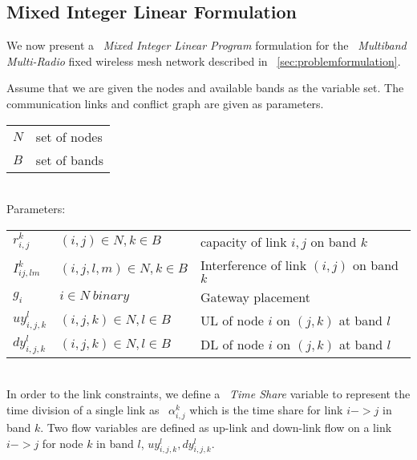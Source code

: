 \subsection{Mixed Integer Linear Formulation}
\label{subsec:linearopt}

We now present a ~\emph{Mixed Integer Linear Program} formulation for the ~\emph{Multiband Multi-Radio} fixed wireless mesh network described in ~\ref{sec:problemformulation}.



Assume that we are given the nodes and available bands as the variable set. The communication links and conflict graph are given as parameters.
\\
\begin{tabular}{ll}
$N$ & set of nodes  \\
$B$ & set of bands  \\
\end{tabular}\\
\vspace{2pt}
Parameters:
\vspace{1pt}

\begin{tabular}{llp{3cm}}
$r_{i,j}^k$ & $(i,j)\in N, k \in B$ & capacity of link $i,j$ on band $k$\\
$I_{ij,lm}^k$ & $(i,j,l,m) \in N, k\in B $ & Interference of link $(i,j)$ on band $k$\\
$g_i$ & $i \in N\ binary$ &
Gateway placement\\
$uy_{i,j,k}^l$ & $(i,j,k) \in N, l \in B$ & 
 UL of node $i$ on $(j,k)$ at band $l$ \\ 
$dy_{i,j,k}^l$ & $(i,j,k) \in N, l \in B$ & 
DL of node $i$ on $(j,k)$ at band $l$ \\ 
\end{tabular}\\


In order to the link constraints, we define a ~\emph{Time Share} variable to represent the time division of a single link as ~\emph{$\alpha_{i,j}^k$} which is the time share for link $i->j$ in band $k$. 
Two flow variables are defined as up-link and down-link flow on a link $i->j$ for node $k$ in band $l$, $uy_{i,j,k}^l,dy_{i,j,k}^l$.


